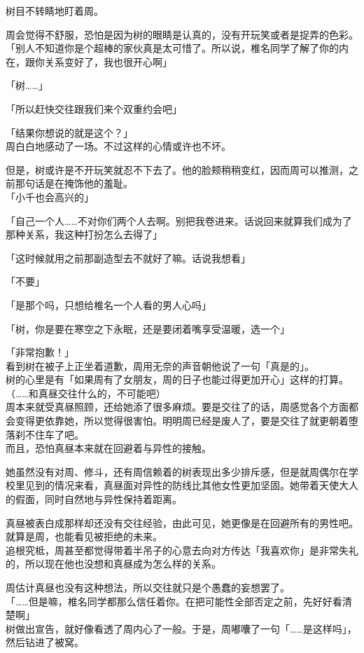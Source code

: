 树目不转睛地盯着周。

周会觉得不舒服，恐怕是因为树的眼睛是认真的，没有开玩笑或者是捉弄的色彩。\\

「别人不知道你是个超棒的家伙真是太可惜了。所以说，椎名同学了解了你的内在，跟你关系变好了，我也很开心啊」

「树……」

「所以赶快交往跟我们来个双重约会吧」

「结果你想说的就是这个？」\\

周白白地感动了一场。不过这样的心情或许也不坏。

但是，树或许是不开玩笑就忍不下去了。他的脸颊稍稍变红，因而周可以推测，之前那句话是在掩饰他的羞耻。\\

「小千也会高兴的」

「自己一个人……不对你们两个人去啊。别把我卷进来。话说回来就算我们成为了那种关系，我这种打扮怎么去得了」

「这时候就用之前那副造型去不就好了嘛。话说我想看」

「不要」

「是那个吗，只想给椎名一个人看的男人心吗」

「树，你是要在寒空之下永眠，还是要闭着嘴享受温暖，选一个」

「非常抱歉！」\\

看到树在被子上正坐着道歉，周用无奈的声音朝他说了一句「真是的」。\\

树的心里是有「如果周有了女朋友，周的日子也能过得更加开心」这样的打算。\\

（……和真昼交往什么的，不可能吧）\\

周本来就受真昼照顾，还给她添了很多麻烦。要是交往了的话，周感觉各个方面都会变得更依靠她，所以觉得很害怕。明明周已经是废人了，要是交往了就更朝着堕落刹不住车了吧。\\

而且，恐怕真昼本来就在回避着与异性的接触。

她虽然没有对周、修斗，还有周信赖着的树表现出多少排斥感，但是就周偶尔在学校里见到的情况来看，真昼面对异性的防线比其他女性更加坚固。她带着天使大人的假面，同时自然地与异性保持着距离。

真昼被表白成那样却还没有交往经验，由此可见，她更像是在回避所有的男性吧。\\

就算是周，也能看见被拒绝的未来。\\

追根究柢，周甚至都觉得带着半吊子的心意去向对方传达「我喜欢你」是非常失礼的，所以现在他也没想和真昼成为怎么样的关系。

周估计真昼也没有这种想法，所以交往就只是个愚蠢的妄想罢了。\\

「……但是嘛，椎名同学都那么信任着你。在把可能性全部否定之前，先好好看清楚啊」\\

树做出宣告，就好像看透了周内心了一般。于是，周嘟囔了一句「……是这样吗」，然后钻进了被窝。
